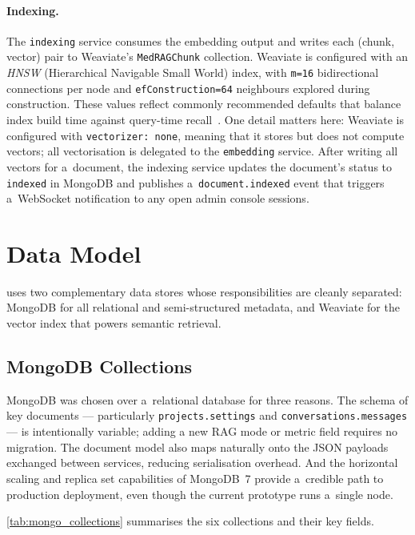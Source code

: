 \paragraph{Indexing.}
The \texttt{indexing} service consumes the embedding output and writes each
(chunk, vector) pair to Weaviate's \texttt{MedRAGChunk} collection.  Weaviate
is configured with an \emph{HNSW} (Hierarchical Navigable Small World) index,
with \texttt{m=16} bidirectional connections per node and
\texttt{efConstruction=64} neighbours explored during construction.  These
values reflect commonly recommended defaults that balance index build time
against query-time recall~\cite{malkov2018hnsw}.  One detail matters here:
Weaviate is configured with \texttt{vectorizer: none}, meaning that it stores
but does not compute vectors; all vectorisation is delegated to the
\texttt{embedding} service.  After writing all vectors for a~document, the indexing service
updates the document's status to \texttt{indexed} in MongoDB and publishes
a~\texttt{document.indexed} event that triggers a~WebSocket notification
to any open admin console sessions.

\section{Data Model}
\label{sec:data_model}

\medrag{} uses two complementary data stores whose responsibilities are
cleanly separated: MongoDB for all relational and semi-structured metadata,
and Weaviate for the vector index that powers semantic retrieval.

\subsection{MongoDB Collections}

MongoDB was chosen over a~relational database for three reasons.
The schema of key documents --- particularly \texttt{projects.settings}
and \texttt{conversations.messages} --- is intentionally variable; adding a
new RAG mode or metric field requires no migration.
The document model also maps naturally onto the JSON payloads exchanged
between services, reducing serialisation overhead.
And the horizontal scaling and replica set capabilities of MongoDB~7 provide
a~credible path to production deployment, even though the current prototype
runs a~single node.

\cref{tab:mongo_collections} summarises the six collections and their key fields.

